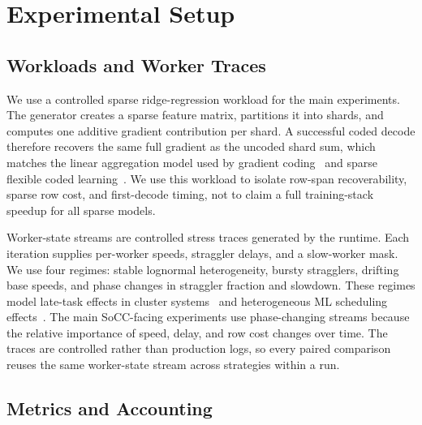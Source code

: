 \section{Experimental Setup}
\label{sec:setup}
\label{sec:experimental-setup}

\subsection{Workloads and Worker Traces}

We use a controlled sparse ridge-regression workload for the main experiments.
The generator creates a sparse feature matrix, partitions it into shards, and
computes one additive gradient contribution per shard.  A successful coded
decode therefore recovers the same full gradient as the uncoded shard sum, which
matches the linear aggregation model used by gradient coding~\cite{tandon2017gradient}
and sparse flexible coded learning~\cite{zhang2025sparseflexible}.  We use this
workload to isolate row-span recoverability, sparse row cost, and first-decode
timing, not to claim a full training-stack speedup for all sparse models.

Worker-state streams are controlled stress traces generated by the runtime.
Each iteration supplies per-worker speeds, straggler delays, and a slow-worker
mask.  We use four regimes: stable lognormal heterogeneity, bursty stragglers,
drifting base speeds, and phase changes in straggler fraction and slowdown.
These regimes model late-task effects in cluster systems~\cite{zaharia2008late}
and heterogeneous ML scheduling effects~\cite{narayanan2020gavel}.  The main
SoCC-facing experiments use phase-changing streams because the relative
importance of speed, delay, and row cost changes over time.  The traces are
controlled rather than production logs, so every paired comparison reuses the
same worker-state stream across strategies within a run.

\subsection{Metrics and Accounting}

